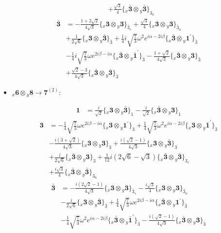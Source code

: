 \documentclass[english]{article}
\newcommand{\rep}[1]{\mathbf{#1}}
\newcommand{\repx}[2]{{}_{#2}\mathbf{#1}}
\newcommand{\tsprodx}[2]{\repx{#1}{x}\otimes\repx{#2}{y}}
\newcommand{\subcgt}[3]{\big\{ \tsprodx{#1}{#2}\big\}^{}_{#3}}
\begin{document}
\begin{itemize}
\begin{fleqn}
\begin{align*}
 & +\frac{\sqrt{3}}{4}\subcgt{\bar{3}}{\bar{3}}{3_{a}}
\end{align*}
\begin{align*}
\rep{\bar{3}} & = -\frac{1+2 \sqrt{2}}{4 \sqrt{3}}\subcgt{3}{3}{\bar{3}_{s}}+\frac{\sqrt{3}}{4}\subcgt{3}{3}{\bar{3}_{a}} \\ 
 & +\frac{1}{2 \sqrt{6}}\subcgt{3}{\bar{3}}{\bar{3}}+\frac{1}{4} i \sqrt{\frac{7}{3}} \omega ^2 e^{i \alpha -2 i \beta }\subcgt{\bar{3}}{1^{\prime}}{\bar{3}} \\ 
 & -\frac{1}{4} i \sqrt{\frac{7}{3}} \omega  e^{2 i \beta -i \alpha }\subcgt{\bar{3}}{\bar{1}^{\prime}}{\bar{3}}-\frac{1+\sqrt{2}}{4 \sqrt{3}}\subcgt{\bar{3}}{3}{\bar{3}} \\ 
 & +\frac{\sqrt{2}-3}{4 \sqrt{3}}\subcgt{\bar{3}}{\bar{3}}{\bar{3}}
\end{align*}
\end{fleqn}
\item $\tsprodx{6}{8}\to\rep{7}^{(2)}$:
\begin{fleqn}
\begin{align*}
\rep{1} & = \frac{i}{\sqrt{2}}\subcgt{3}{\bar{3}}{1}-\frac{i}{\sqrt{2}}\subcgt{\bar{3}}{3}{1}
\end{align*}
\begin{align*}
\rep{3} & = -\frac{1}{4} \sqrt{\frac{7}{3}} \omega  e^{2 i \beta -i \alpha }\subcgt{3}{1^{\prime}}{3}+\frac{1}{4} \sqrt{\frac{7}{3}} \omega ^2 e^{i \alpha -2 i \beta }\subcgt{3}{\bar{1}^{\prime}}{3} \\ 
 & -\frac{i \left(3+\sqrt{2}\right)}{4 \sqrt{3}}\subcgt{3}{3}{3}+\frac{i \left(\sqrt{2}-1\right)}{4 \sqrt{3}}\subcgt{3}{\bar{3}}{3} \\ 
 & +\frac{i}{2 \sqrt{6}}\subcgt{\bar{3}}{3}{3}+\frac{1}{12} i \left(2 \sqrt{6}-\sqrt{3}\right)\subcgt{\bar{3}}{\bar{3}}{3_{s}} \\ 
 & +\frac{i \sqrt{3}}{4}\subcgt{\bar{3}}{\bar{3}}{3_{a}}
\end{align*}
\begin{align*}
\rep{\bar{3}} & = -\frac{i \left(2 \sqrt{2}-1\right)}{4 \sqrt{3}}\subcgt{3}{3}{\bar{3}_{s}}-\frac{i \sqrt{3}}{4}\subcgt{3}{3}{\bar{3}_{a}} \\ 
 & -\frac{i}{2 \sqrt{6}}\subcgt{3}{\bar{3}}{\bar{3}}+\frac{1}{4} \sqrt{\frac{7}{3}} \omega  e^{2 i \beta -i \alpha }\subcgt{\bar{3}}{1^{\prime}}{\bar{3}} \\ 
 & -\frac{1}{4} \sqrt{\frac{7}{3}} \omega ^2 e^{i \alpha -2 i \beta }\subcgt{\bar{3}}{\bar{1}^{\prime}}{\bar{3}}-\frac{i \left(\sqrt{2}-1\right)}{4 \sqrt{3}}\subcgt{\bar{3}}{3}{\bar{3}} \\ 

\end{align*}
\end{fleqn}
\end{itemize}
\end{document}
